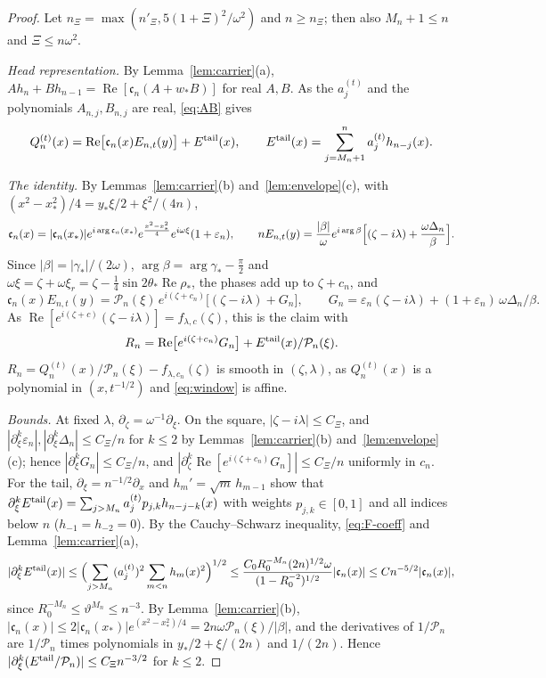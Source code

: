 \documentclass[11pt]{amsart}
\theoremstyle{definition}
\theoremstyle{remark}
\numberwithin{equation}{section}
\newcommand{\eps}{\varepsilon}
\DeclareMathOperator{\re}{Re}
\begin{document}
\begin{proof}
Let $n_\Xi=\max(n'_\Xi,5(1+\Xi)^2/\omega^2)$ and $n\ge n_\Xi$; then also $M_n+1\le n$ and $\Xi\le n\omega^2$.

\emph{Head representation.} By Lemma~\ref{lem:carrier}(a), $Ah_n+Bh_{n-1}=\re[\mathfrak c_n(A+w_*B)]$ for real $A,B$.
As the $a^{(t)}_j$ and the polynomials $A_{n,j},B_{n,j}$ are real, \eqref{eq:AB} gives
\[
Q_n^{(t)}(x)=\re\bigl[\mathfrak c_n(x)E_{n,t}(y)\bigr]+E^{\rm tail}(x),\qquad E^{\rm tail}(x)=\sum_{j=M_n+1}^na^{(t)}_jh_{n-j}(x).
\]

\emph{The identity.} By Lemmas~\ref{lem:carrier}(b) and~\ref{lem:envelope}(c), with
$(x^2-x_*^2)/4=y_*\xi/2+\xi^2/(4n)$,
\[
\mathfrak c_n(x)=|\mathfrak c_n(x_*)|e^{i\arg\mathfrak c_n(x_*)}e^{\frac{x^2-x_*^2}4}e^{i\omega\xi}(1+\eps_n),\qquad
nE_{n,t}(y)=\frac{|\beta|}\omega e^{i\arg\beta}\Bigl[(\zeta-i\lambda)+\frac{\omega\Delta_n}{\beta}\Bigr].
\]
Since $|\beta|=|\gamma_*|/(2\omega)$, $\arg\beta=\arg\gamma_*-\frac\pi2$ and
$\omega\xi=\zeta+\omega\xi_r=\zeta-\frac14\sin2\theta_*\re\rho_*$, the phases add up to $\zeta+c_n$, and
\[
\mathfrak c_n(x)E_{n,t}(y)=\mathcal P_n(\xi)\,e^{i(\zeta+c_n)}\bigl[(\zeta-i\lambda)+G_n\bigr],\qquad
G_n=\eps_n(\zeta-i\lambda)+(1+\eps_n)\,\omega\Delta_n/\beta .
\]
As $\re[e^{i(\zeta+c)}(\zeta-i\lambda)]=f_{\lambda,c}(\zeta)$, this is the claim with
\[
R_n=\re\bigl[e^{i(\zeta+c_n)}G_n\bigr]+E^{\rm tail}(x)/\mathcal P_n(\xi).
\]
$R_n=Q_n^{(t)}(x)/\mathcal P_n(\xi)-f_{\lambda,c_n}(\zeta)$ is smooth in $(\zeta,\lambda)$, as $Q_n^{(t)}(x)$ is a polynomial in
$(x,t^{-1/2})$ and \eqref{eq:window} is affine.

\emph{Bounds.} At fixed $\lambda$, $\partial_\zeta=\omega^{-1}\partial_\xi$. On the square, $|\zeta-i\lambda|\le C_\Xi$, and
$|\partial_\xi^k\eps_n|,|\partial_\xi^k\Delta_n|\le C_\Xi/n$ for $k\le2$ by Lemmas~\ref{lem:carrier}(b)
and~\ref{lem:envelope}(c); hence $|\partial_\xi^kG_n|\le C_\Xi/n$, and $|\partial_\zeta^k\re[e^{i(\zeta+c_n)}G_n]|\le C_\Xi/n$
uniformly in $c_n$. For the tail, $\partial_\xi=n^{-1/2}\partial_x$ and $h_m'=\sqrt m\,h_{m-1}$ show that
$\partial_\xi^kE^{\rm tail}(x)=\sum_{j>M_n}a^{(t)}_jp_{j,k}h_{n-j-k}(x)$ with weights $p_{j,k}\in[0,1]$ and
all indices below $n$ ($h_{-1}=h_{-2}=0$). By the Cauchy--Schwarz inequality, \eqref{eq:F-coeff} and
Lemma~\ref{lem:carrier}(a),
\[
|\partial_\xi^kE^{\rm tail}(x)|\le\Bigl(\sum_{j>M_n}(a^{(t)}_j)^2\sum_{m<n}h_m(x)^2\Bigr)^{1/2}
\le\frac{C_0R_0^{-M_n}(2n)^{1/2}\omega}{(1-R_0^{-2})^{1/2}}|\mathfrak c_n(x)|\le Cn^{-5/2}|\mathfrak c_n(x)|,
\]
since $R_0^{-M_n}\le\vartheta^{M_n}\le n^{-3}$. By Lemma~\ref{lem:carrier}(b),
$|\mathfrak c_n(x)|\le2|\mathfrak c_n(x_*)|e^{(x^2-x_*^2)/4}=2n\omega\mathcal P_n(\xi)/|\beta|$, and the derivatives of
$1/\mathcal P_n$ are $1/\mathcal P_n$ times polynomials in $y_*/2+\xi/(2n)$ and $1/(2n)$. Hence
$|\partial_\xi^k(E^{\rm tail}/\mathcal P_n)|\le C_\Xi n^{-3/2}$ for $k\le2$.
\end{proof}
\end{document}
